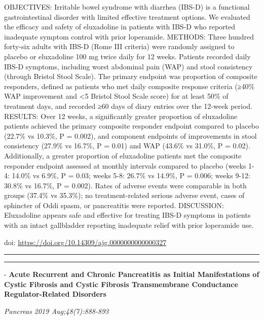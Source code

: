 \documentclass[]{article}
\begin{document}
OBJECTIVES: Irritable bowel syndrome with diarrhea (IBS-D) is a
functional gastrointestinal disorder with limited effective treatment
options. We evaluated the efficacy and safety of eluxadoline in patients
with IBS-D who reported inadequate symptom control with prior
loperamide. METHODS: Three hundred forty-six adults with IBS-D (Rome III
criteria) were randomly assigned to placebo or eluxadoline 100 mg twice
daily for 12 weeks. Patients recorded daily IBS-D symptoms, including
worst abdominal pain (WAP) and stool consistency (through Bristol Stool
Scale). The primary endpoint was proportion of composite responders,
defined as patients who met daily composite response criteria (≥40\% WAP
improvement and \textless{}5 Bristol Stool Scale score) for at least
50\% of treatment days, and recorded ≥60 days of diary entries over the
12-week period. RESULTS: Over 12 weeks, a significantly greater
proportion of eluxadoline patients achieved the primary composite
responder endpoint compared to placebo (22.7\% vs 10.3\%, P = 0.002),
and component endpoints of improvements in stool consistency (27.9\% vs
16.7\%, P = 0.01) and WAP (43.6\% vs 31.0\%, P = 0.02). Additionally, a
greater proportion of eluxadoline patients met the composite responder
endpoint assessed at monthly intervals compared to placebo (weeks 1-4:
14.0\% vs 6.9\%, P = 0.03; weeks 5-8: 26.7\% vs 14.9\%, P = 0.006; weeks
9-12: 30.8\% vs 16.7\%, P = 0.002). Rates of adverse events were
comparable in both groups (37.4\% vs 35.3\%); no treatment-related
serious adverse event, cases of sphincter of Oddi spasm, or pancreatitis
were reported. DISCUSSION: Eluxadoline appears safe and effective for
treating IBS-D symptoms in patients with an intact gallbladder reporting
inadequate relief with prior loperamide use.

doi: \url{https://doi.org/10.14309/ajg.0000000000000327}

{}

{}

\begin{center}\rule{0.5\linewidth}{\linethickness}\end{center}

\begin{center}\rule{0.5\linewidth}{\linethickness}\end{center}

 - \textbf{Acute Recurrent and Chronic Pancreatitis as Initial
Manifestations of Cystic Fibrosis and Cystic Fibrosis Transmembrane
Conductance Regulator-Related Disorders}

\emph{Pancreas 2019 Aug;48(7):888-893}
\end{document}

